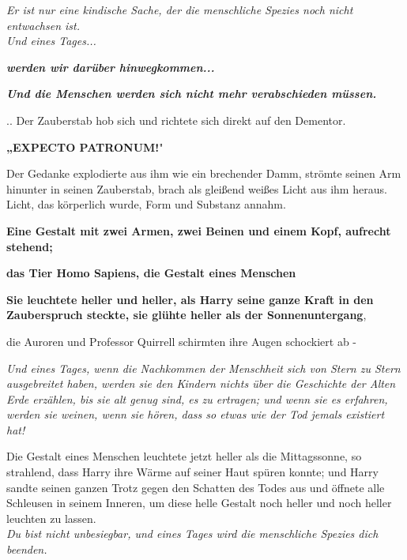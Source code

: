 {\emph{Er ist nur eine kindische Sache, der die menschliche Spezies noch nicht entwachsen ist.\\ Und eines Tages...}

\hfill\break

\textbf{\emph{werden wir darüber hinwegkommen...}}

\hfill\break

\textbf{\emph{Und die Menschen werden sich nicht mehr verabschieden müssen.}}

\hfill\break

\hfill\break .. Der Zauberstab hob sich und richtete sich direkt auf den Dementor.

\hfill\break

\hfill\break \textbf{„EXPECTO PATRONUM!}"

Der Gedanke explodierte aus ihm wie ein brechender Damm, strömte seinen Arm hinunter in seinen Zauberstab, brach als gleißend weißes Licht aus ihm heraus. Licht, das körperlich wurde, Form und Substanz annahm.

\textbf{Eine Gestalt mit zwei Armen, zwei Beinen und einem Kopf, aufrecht stehend;}

\hfill\break

\textbf{das Tier Homo Sapiens, die Gestalt eines Menschen}

\hfill\break \textbf{Sie leuchtete heller und heller, als Harry seine ganze Kraft in den Zauberspruch steckte, sie glühte heller als der Sonnenuntergang},

die Auroren und Professor Quirrell schirmten ihre Augen schockiert ab -

\emph{Und eines Tages, wenn die Nachkommen der Menschheit sich von Stern zu Stern ausgebreitet haben, werden sie den Kindern nichts über die Geschichte der Alten Erde erzählen, bis sie alt genug sind, es zu ertragen; und wenn sie es erfahren, werden sie weinen, wenn sie hören, dass so etwas wie der Tod jemals existiert hat!}

Die Gestalt eines Menschen leuchtete jetzt heller als die Mittagssonne, so strahlend, dass Harry ihre Wärme auf seiner Haut spüren konnte; und Harry sandte seinen ganzen Trotz gegen den Schatten des Todes aus und öffnete alle Schleusen in seinem Inneren, um diese helle Gestalt noch heller und noch heller leuchten zu lassen.\\

\hfill\break \emph{Du bist nicht unbesiegbar, und eines Tages wird die menschliche Spezies dich beenden.}

\hfill\break

}
